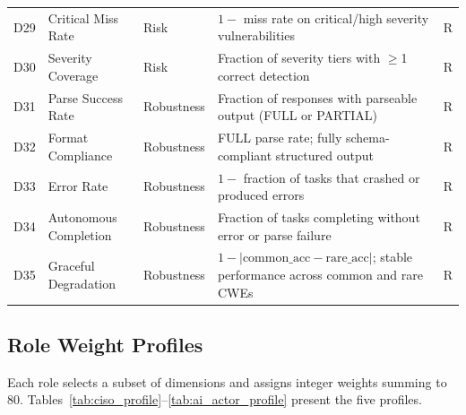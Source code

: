 \documentclass[10pt,twocolumn]{article}
\begin{document}
\begin{table}[!htbp]
\begin{tabular}{@{}r l l p{6.2cm} c@{}}
D29 & Critical Miss Rate         & Risk & $1 -$ miss rate on critical/high severity vulnerabilities & R \\
D30 & Severity Coverage          & Risk & Fraction of severity tiers with $\geq$1 correct detection & R \\
\midrule
D31 & Parse Success Rate         & Robustness & Fraction of responses with parseable output (FULL or PARTIAL) & R \\
D32 & Format Compliance          & Robustness & FULL parse rate; fully schema-compliant structured output & R \\
D33 & Error Rate                 & Robustness & $1 -$ fraction of tasks that crashed or produced errors & R \\
D34 & Autonomous Completion      & Robustness & Fraction of tasks completing without error or parse failure & R \\
D35 & Graceful Degradation       & Robustness & $1 - |\text{common\_acc} - \text{rare\_acc}|$; stable performance across common and rare CWEs & R \\
\bottomrule
\end{tabular}
\end{table}

\subsection{Role Weight Profiles}

Each role selects a subset of dimensions and assigns integer weights summing to 80. Tables~\ref{tab:ciso_profile}--\ref{tab:ai_actor_profile} present the five profiles.
\end{document}
